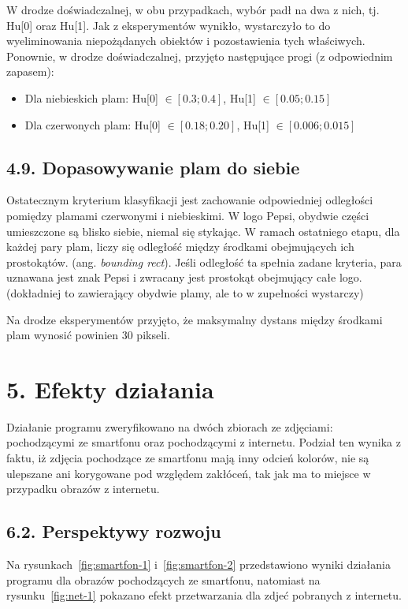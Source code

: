 \documentclass[11pt,a4paper,twoside]{report}
\begin{document}
			W drodze doświadczalnej, w obu przypadkach, wybór padł na dwa z nich, tj. Hu[0] oraz Hu[1]. Jak z eksperymentów wynikło, wystarczyło to do wyeliminowania niepożądanych obiektów i pozostawienia tych właściwych. Ponownie, w drodze doświadczalnej, przyjęto następujące progi (z odpowiednim zapasem):

			\begin{itemize}
				\item Dla niebieskich plam: Hu[0] $\in [0.3; 0.4]$, Hu[1] $\in [0.05; 0.15]$
				\item Dla czerwonych plam: Hu[0] $\in [0.18; 0.20]$, Hu[1] $\in [0.006; 0.015]$
			\end{itemize}

	\subsection*{4.9. Dopasowywanie plam do siebie}

			Ostatecznym kryterium klasyfikacji jest zachowanie odpowiedniej odległości pomiędzy plamami czerwonymi i niebieskimi. W logo Pepsi, obydwie części umieszczone są blisko siebie, niemal się stykając. W ramach ostatniego etapu, dla każdej pary plam, liczy się odległość między środkami obejmujących ich prostokątów. (ang. \emph{bounding rect}). Jeśli odległość ta spełnia zadane kryteria, para uznawana jest znak Pepsi i zwracany jest prostokąt obejmujący całe logo. (dokładniej to zawierający obydwie plamy, ale to w zupełności wystarczy)

			Na drodze eksperymentów przyjęto, że maksymalny dystans między środkami plam wynosić powinien 30 pikseli.

\section*{5. Efekty działania}

	Działanie programu zweryfikowano na dwóch zbiorach ze zdjęciami: pochodzącymi ze smartfonu oraz pochodzącymi z internetu. Podział ten wynika z faktu, iż zdjęcia pochodzące ze smartfonu mają inny odcień kolorów, nie są ulepszane ani korygowane pod względem zakłóceń, tak jak ma to miejsce w przypadku obrazów z internetu.

	\subsection*{6.2. Perspektywy rozwoju}
	Na rysunkach~\ref{fig:smartfon-1} i~\ref{fig:smartfon-2} przedstawiono wyniki działania programu dla obrazów pochodzących ze smartfonu, natomiast na rysunku~\ref{fig:net-1} pokazano efekt przetwarzania dla zdjeć pobranych z internetu.
\end{document}
